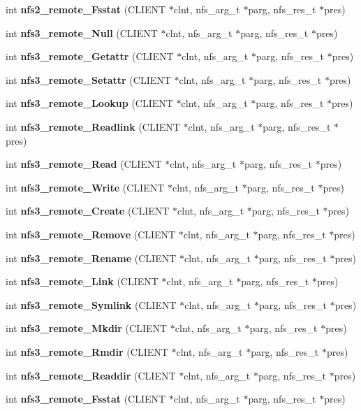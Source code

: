 \begin{DoxyCompactItemize}
\item 
int {\bf nfs2\_\-remote\_\-Fsstat} (CLIENT $\ast$clnt, nfs\_\-arg\_\-t $\ast$parg, nfs\_\-res\_\-t $\ast$pres)
\item 
int {\bf nfs3\_\-remote\_\-Null} (CLIENT $\ast$clnt, nfs\_\-arg\_\-t $\ast$parg, nfs\_\-res\_\-t $\ast$pres)
\item 
int {\bf nfs3\_\-remote\_\-Getattr} (CLIENT $\ast$clnt, nfs\_\-arg\_\-t $\ast$parg, nfs\_\-res\_\-t $\ast$pres)
\item 
int {\bf nfs3\_\-remote\_\-Setattr} (CLIENT $\ast$clnt, nfs\_\-arg\_\-t $\ast$parg, nfs\_\-res\_\-t $\ast$pres)
\item 
int {\bf nfs3\_\-remote\_\-Lookup} (CLIENT $\ast$clnt, nfs\_\-arg\_\-t $\ast$parg, nfs\_\-res\_\-t $\ast$pres)
\item 
int {\bf nfs3\_\-remote\_\-Readlink} (CLIENT $\ast$clnt, nfs\_\-arg\_\-t $\ast$parg, nfs\_\-res\_\-t $\ast$pres)
\item 
int {\bf nfs3\_\-remote\_\-Read} (CLIENT $\ast$clnt, nfs\_\-arg\_\-t $\ast$parg, nfs\_\-res\_\-t $\ast$pres)
\item 
int {\bf nfs3\_\-remote\_\-Write} (CLIENT $\ast$clnt, nfs\_\-arg\_\-t $\ast$parg, nfs\_\-res\_\-t $\ast$pres)
\item 
int {\bf nfs3\_\-remote\_\-Create} (CLIENT $\ast$clnt, nfs\_\-arg\_\-t $\ast$parg, nfs\_\-res\_\-t $\ast$pres)
\item 
int {\bf nfs3\_\-remote\_\-Remove} (CLIENT $\ast$clnt, nfs\_\-arg\_\-t $\ast$parg, nfs\_\-res\_\-t $\ast$pres)
\item 
int {\bf nfs3\_\-remote\_\-Rename} (CLIENT $\ast$clnt, nfs\_\-arg\_\-t $\ast$parg, nfs\_\-res\_\-t $\ast$pres)
\item 
int {\bf nfs3\_\-remote\_\-Link} (CLIENT $\ast$clnt, nfs\_\-arg\_\-t $\ast$parg, nfs\_\-res\_\-t $\ast$pres)
\item 
int {\bf nfs3\_\-remote\_\-Symlink} (CLIENT $\ast$clnt, nfs\_\-arg\_\-t $\ast$parg, nfs\_\-res\_\-t $\ast$pres)
\item 
int {\bf nfs3\_\-remote\_\-Mkdir} (CLIENT $\ast$clnt, nfs\_\-arg\_\-t $\ast$parg, nfs\_\-res\_\-t $\ast$pres)
\item 
int {\bf nfs3\_\-remote\_\-Rmdir} (CLIENT $\ast$clnt, nfs\_\-arg\_\-t $\ast$parg, nfs\_\-res\_\-t $\ast$pres)
\item 
int {\bf nfs3\_\-remote\_\-Readdir} (CLIENT $\ast$clnt, nfs\_\-arg\_\-t $\ast$parg, nfs\_\-res\_\-t $\ast$pres)
\item 
int {\bf nfs3\_\-remote\_\-Fsstat} (CLIENT $\ast$clnt, nfs\_\-arg\_\-t $\ast$parg, nfs\_\-res\_\-t $\ast$pres)

\end{DoxyCompactItemize}
